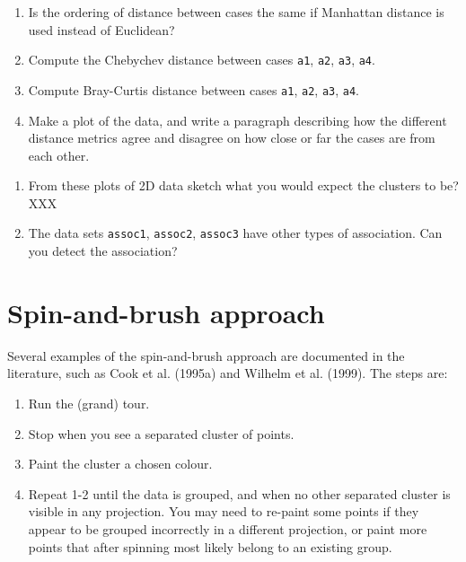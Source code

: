 \documentclass[
  letterpaper,
]{krantz}
\providecommand{\tightlist}{%
  \setlength{\itemsep}{0pt}\setlength{\parskip}{0pt}}\usepackage{longtable,booktabs,array}
\begin{document}
\begin{enumerate}
\def\labelenumi{\arabic{enumi}.}
\setcounter{enumi}{3}
\item
  Is the ordering of distance between cases the same if Manhattan
  distance is used instead of Euclidean?
\item
  Compute the Chebychev distance between cases \texttt{a1}, \texttt{a2},
  \texttt{a3}, \texttt{a4}.
\item
  Compute Bray-Curtis distance between cases \texttt{a1}, \texttt{a2},
  \texttt{a3}, \texttt{a4}.
\item
  Make a plot of the data, and write a paragraph describing how the
  different distance metrics agree and disagree on how close or far the
  cases are from each other.
\end{enumerate}

\begin{enumerate}
\def\labelenumi{\arabic{enumi}.}
\setcounter{enumi}{7}
\item
  From these plots of 2D data sketch what you would expect the clusters
  to be? XXX
\item
  The data sets \texttt{assoc1}, \texttt{assoc2}, \texttt{assoc3} have
  other types of association. Can you detect the association?
\end{enumerate}


\chapter{Spin-and-brush approach}\label{sec-clust-graphics}

 

Several examples of the spin-and-brush approach are documented in the
literature, such as Cook et al. (1995a) and Wilhelm et al. (1999). The
steps are:

\begin{enumerate}
\def\labelenumi{\arabic{enumi}.}
\tightlist
\item
  Run the (grand) tour.
\item
  Stop when you see a separated cluster of points.
\item
  Paint the cluster a chosen colour.
\item
  Repeat 1-2 until the data is grouped, and when no other separated
  cluster is visible in any projection. You may need to re-paint some
  points if they appear to be grouped incorrectly in a different
  projection, or paint more points that after spinning most likely
  belong to an existing group.
\end{enumerate}
\end{document}
